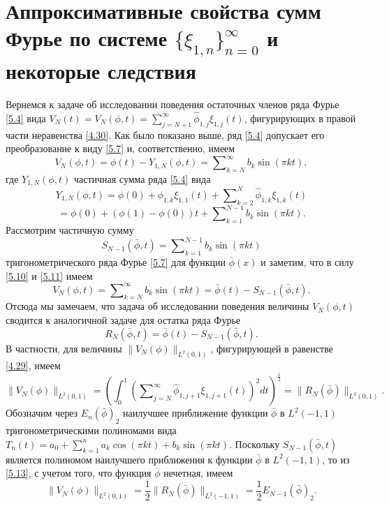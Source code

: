 \section{Аппроксимативные свойства сумм Фурье по системе $\{\xi_{1,n}\}_{n=0}^\infty$ и некоторые следствия}
Вернемся к задаче об исследовании поведения остаточных членов ряда Фурье \eqref{5.4}   вида $V_N(t)=V_N(\phi,t)=\sum\nolimits_{j=N+1}^\infty \hat \phi_{1,j}\xi_{1,j}(t)$, фигурирующих в правой части неравенства \eqref{4.30}. Как было показано выше, ряд \eqref{5.4} допускает его преобразование к виду \eqref{5.7} и, соответственно, имеем
\begin{equation}\label{5.9}
V_N(\phi,t)=\phi(t)-Y_{1,N}(\phi,t)= \sum\nolimits_{k=N}^\infty b_k\sin(\pi kt),
\end{equation}
где  $Y_{1,N}(\phi,t)$ частичная сумма ряда \eqref{5.4} вида
$$
Y_{1,N}(\phi,t)= \phi(0)+\phi_{1,k}\xi_{1,1}(t)+ \sum\nolimits_{k=2}^N \hat \phi_{1,k}\xi_{1,k}(t)
$$
\begin{equation}\label{5.10}
= \phi(0)+(\phi(1)-\phi(0))t+\sum\nolimits_{k=1}^{N-1} b_k\sin(\pi kt).
\end{equation}
Рассмотрим частичную сумму
\begin{equation}\label{5.11}
S_{N-1}(\bar\phi,t)= \sum\nolimits_{k=1}^{N-1} b_k\sin(\pi kt)
\end{equation}
тригонометрического ряда Фурье \eqref{5.7} для функции $\bar\phi(x)$ и заметим, что в силу \eqref{5.10} и \eqref{5.11} имеем
\begin{equation}\label{5.12}
V_N(\phi,t)= \sum\nolimits_{k=N}^{\infty} b_k\sin(\pi kt)=\bar\phi(t)-S_{N-1}(\bar\phi,t).
\end{equation}
Отсюда мы замечаем, что задача об исследовании поведения величины $V_N(\phi,t)$ сводится к аналогичной задаче для остатка ряда Фурье
\begin{equation}\label{5.13}
R_N(\bar\phi,t)= \bar\phi(t)-S_{N-1}(\bar\phi,t).
\end{equation}
В частности, для величины $\|V_N(\phi)\|_{L^2(0,1)}$, фигурирующей в равенстве \eqref{4.29}, имеем
\begin{equation}\label{5.14}
\|V_N(\phi)\|_{L^2(0,1)}=\left(\int_{0}^1\left(\sum\nolimits_{j=N}^\infty \hat \phi_{1,j+1}\xi_{1,j+1}(t)\right)^2 dt\right)^\frac12=\|R_N(\bar\phi)\|_{L^2(0,1)}.
\end{equation}
Обозначим через $E_n(\bar\phi)_2$ наилучшее приближение функции $\bar\phi$ в $L^2(-1,1)$ тригонометрическими полиномами вида $T_n(t)=a_0+\sum_{k=1}^{n}a_k\cos(\pi kt)+b_k\sin(\pi kt)$. Поскольку $S_{N-1}(\bar\phi,t)$ является полиномом наилучшего приближения к функции $\bar\phi$ в $L^2(-1,1)$, то из \eqref{5.13}, с учетом того, что функция $\bar\phi$ нечетная, имеем
\begin{equation}\label{5.15}
\|V_N(\phi)\|_{L^2(0,1)}=\frac12\|R_N(\bar\phi)\|_{L^2(-1,1)}=\frac12E_{N-1}(\bar\phi)_2.
\end{equation}


